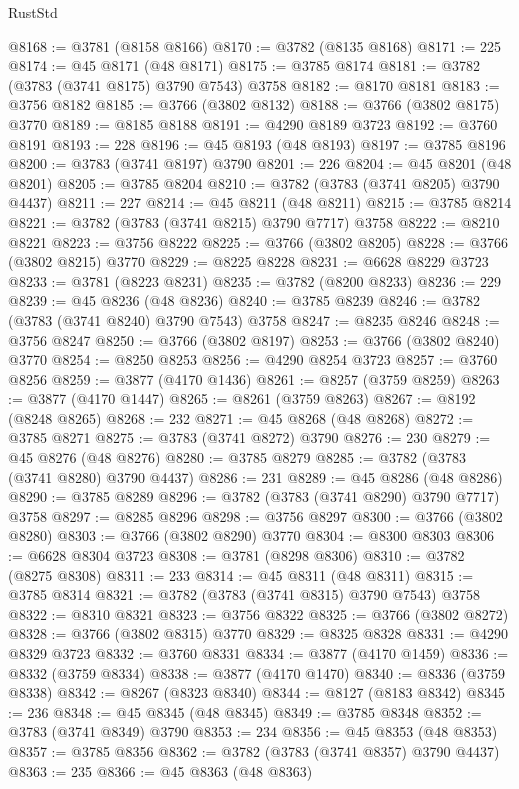 \begin{lexlean}{RustStd}
\begin{coremodule}
@8168 := @3781 (@8158 @8166)
@8170 := @3782 (@8135 @8168)
@8171 := 225
@8174 := @45 @8171 (@48 @8171)
@8175 := @3785 @8174
@8181 := @3782 (@3783 (@3741 @8175) @3790 @7543) @3758
@8182 := @8170 @8181
@8183 := @3756 @8182
@8185 := @3766 (@3802 @8132)
@8188 := @3766 (@3802 @8175) @3770
@8189 := @8185 @8188
@8191 := @4290 @8189 @3723
@8192 := @3760 @8191
@8193 := 228
@8196 := @45 @8193 (@48 @8193)
@8197 := @3785 @8196
@8200 := @3783 (@3741 @8197) @3790
@8201 := 226
@8204 := @45 @8201 (@48 @8201)
@8205 := @3785 @8204
@8210 := @3782 (@3783 (@3741 @8205) @3790 @4437)
@8211 := 227
@8214 := @45 @8211 (@48 @8211)
@8215 := @3785 @8214
@8221 := @3782 (@3783 (@3741 @8215) @3790 @7717) @3758
@8222 := @8210 @8221
@8223 := @3756 @8222
@8225 := @3766 (@3802 @8205)
@8228 := @3766 (@3802 @8215) @3770
@8229 := @8225 @8228
@8231 := @6628 @8229 @3723
@8233 := @3781 (@8223 @8231)
@8235 := @3782 (@8200 @8233)
@8236 := 229
@8239 := @45 @8236 (@48 @8236)
@8240 := @3785 @8239
@8246 := @3782 (@3783 (@3741 @8240) @3790 @7543) @3758
@8247 := @8235 @8246
@8248 := @3756 @8247
@8250 := @3766 (@3802 @8197)
@8253 := @3766 (@3802 @8240) @3770
@8254 := @8250 @8253
@8256 := @4290 @8254 @3723
@8257 := @3760 @8256
@8259 := @3877 (@4170 @1436)
@8261 := @8257 (@3759 @8259)
@8263 := @3877 (@4170 @1447)
@8265 := @8261 (@3759 @8263)
@8267 := @8192 (@8248 @8265)
@8268 := 232
@8271 := @45 @8268 (@48 @8268)
@8272 := @3785 @8271
@8275 := @3783 (@3741 @8272) @3790
@8276 := 230
@8279 := @45 @8276 (@48 @8276)
@8280 := @3785 @8279
@8285 := @3782 (@3783 (@3741 @8280) @3790 @4437)
@8286 := 231
@8289 := @45 @8286 (@48 @8286)
@8290 := @3785 @8289
@8296 := @3782 (@3783 (@3741 @8290) @3790 @7717) @3758
@8297 := @8285 @8296
@8298 := @3756 @8297
@8300 := @3766 (@3802 @8280)
@8303 := @3766 (@3802 @8290) @3770
@8304 := @8300 @8303
@8306 := @6628 @8304 @3723
@8308 := @3781 (@8298 @8306)
@8310 := @3782 (@8275 @8308)
@8311 := 233
@8314 := @45 @8311 (@48 @8311)
@8315 := @3785 @8314
@8321 := @3782 (@3783 (@3741 @8315) @3790 @7543) @3758
@8322 := @8310 @8321
@8323 := @3756 @8322
@8325 := @3766 (@3802 @8272)
@8328 := @3766 (@3802 @8315) @3770
@8329 := @8325 @8328
@8331 := @4290 @8329 @3723
@8332 := @3760 @8331
@8334 := @3877 (@4170 @1459)
@8336 := @8332 (@3759 @8334)
@8338 := @3877 (@4170 @1470)
@8340 := @8336 (@3759 @8338)
@8342 := @8267 (@8323 @8340)
@8344 := @8127 (@8183 @8342)
@8345 := 236
@8348 := @45 @8345 (@48 @8345)
@8349 := @3785 @8348
@8352 := @3783 (@3741 @8349) @3790
@8353 := 234
@8356 := @45 @8353 (@48 @8353)
@8357 := @3785 @8356
@8362 := @3782 (@3783 (@3741 @8357) @3790 @4437)
@8363 := 235
@8366 := @45 @8363 (@48 @8363)

\end{coremodule}
\end{lexlean}

